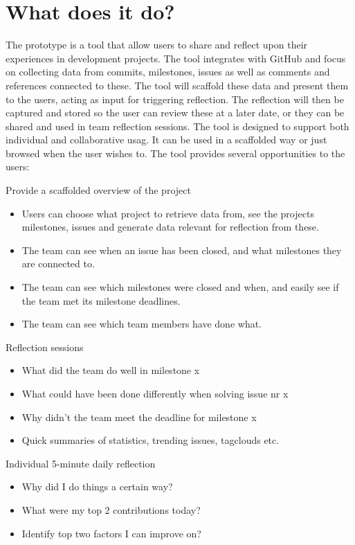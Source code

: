 \section{What does it do?}
The prototype is a tool that allow users to share and reflect upon their experiences in development projects. The tool integrates with GitHub and focus on collecting data from commits, milestones, issues as well as comments and references connected to these. The tool will scaffold these data and present them to the users, acting as input for triggering reflection. The reflection will then be captured and stored so the user can review these at a later date, or they can be shared and used in team reflection sessions. The tool is designed to support both individual and collaborative usag. It can be used in a scaffolded way or just browsed when the user wishes to. The tool provides several opportunities to the users:
\begin{description}

	\item{Provide a scaffolded overview of the project} 
	\begin{itemize}
	\item Users can choose what project to retrieve data from, see the projects milestones, issues and generate data relevant for reflection from these.
	\item The team can see when an issue has been closed, and what milestones they are connected to.
	\item The team can see which milestones were closed and when, and easily see if the team met its milestone deadlines. 
	\item The team can see which team members have done what.
	\end{itemize}

	\item {Reflection sessions} 
	\begin{itemize}
	\item What did the team do well in milestone x
	\item What could have been done differently when solving issue nr x
	\item Why didn't the team meet the deadline for milestone x
	\item Quick summaries of statistics, trending issues, tagclouds etc.
	\end{itemize}

	\item {Individual 5-minute daily reflection} 
	\begin{itemize}
	\item Why did I do things a certain way?
	\item What were my top 2 contributions today?
	\item Identify top two factors I can improve on?
	\end{itemize}
\end{description}

